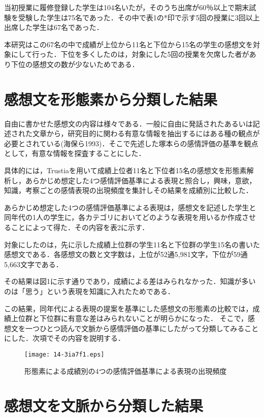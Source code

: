 \documentclass[japanese]{jnlp_1.3a}
\begin{document}
当初授業に履修登録した学生は104名いたが，そのうち出席が60％以上で期末試験を受験した学生は75名であった．その中で表1の*印で示す5回の授業に3回以上出席した学生は67名であった．

本研究はこの67名の中で成績が上位から11名と下位から15名の学生の感想文を対象にして行った．下位を多くしたのは，対象にした5回の授業を欠席した者があり下位の感想文の数が少ないためである．

\begin{table}[b]

\label{table2}
\end{table}

\section{感想文を形態素から分類した結果}

自由に書かせた感想文の内容は様々である．一般に自由に発話されたあるいは記述された文章から，研究目的に関わる有意な情報を抽出するにはある種の観点が必要とされている(海保ら1993)．そこで先述した塚本らの感情評価の基準を観点として，有意な情報を探査することにした．

具体的には，Trustiaを用いて成績上位者11名と下位者15名の感想文を形態素解析し，あらかじめ想定した4つ感情評価基準による表現と照合し，興味，意欲，知識，考察ごとの感情表現の出現頻度を集計しその結果を成績別に比較した．

あらかじめ想定した4つの感情評価基準による表現は，感想文を記述した学生と同年代の1人の学生に，各カテゴリにおいてどのような表現を用いるか作成させることによって得た．その内容を表2に示す．

対象にしたのは，先に示した成績上位群の学生11名と下位群の学生15名の書いた感想文である．各感想文の数と文字数は，上位が52通5,981文字，下位が59通5,663文字である．

その結果は図1に示す通りであり，成績による差はみられなかった．知識が多いのは「思う」という表現を知識に入れたためである．

この結果，同年代による表現の提案を基準にした感想文の形態素の比較では，成績上位群と下位群に有意な差はみられないことが明らかになった． 
そこで，感想文を一つひとつ読んで文脈から感情評価の基準にしたがって分類してみることにした．次項でその内容を説明する．

\begin{figure}[tbp]
\centerline{\texttt{[image: 14-3ia7f1.eps]}}
\caption{形態素による成績別の4つの感情評価基準による表現の出現頻度}
\label{fig1}
\end{figure}

\section{感想文を文脈から分類した結果}
\end{document}
